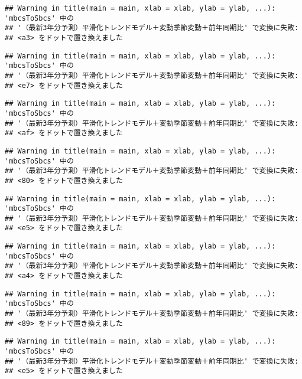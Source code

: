 \documentclass[]{article}
\begin{document}
\begin{verbatim}
## Warning in title(main = main, xlab = xlab, ylab = ylab, ...): 'mbcsToSbcs' 中の
## '（最新3年分予測）平滑化トレンドモデル＋変動季節変動＋前年同期比' で変換に失敗:
## <a3> をドットで置き換えました
\end{verbatim}

\begin{verbatim}
## Warning in title(main = main, xlab = xlab, ylab = ylab, ...): 'mbcsToSbcs' 中の
## '（最新3年分予測）平滑化トレンドモデル＋変動季節変動＋前年同期比' で変換に失敗:
## <e7> をドットで置き換えました
\end{verbatim}

\begin{verbatim}
## Warning in title(main = main, xlab = xlab, ylab = ylab, ...): 'mbcsToSbcs' 中の
## '（最新3年分予測）平滑化トレンドモデル＋変動季節変動＋前年同期比' で変換に失敗:
## <af> をドットで置き換えました
\end{verbatim}

\begin{verbatim}
## Warning in title(main = main, xlab = xlab, ylab = ylab, ...): 'mbcsToSbcs' 中の
## '（最新3年分予測）平滑化トレンドモデル＋変動季節変動＋前年同期比' で変換に失敗:
## <80> をドットで置き換えました
\end{verbatim}

\begin{verbatim}
## Warning in title(main = main, xlab = xlab, ylab = ylab, ...): 'mbcsToSbcs' 中の
## '（最新3年分予測）平滑化トレンドモデル＋変動季節変動＋前年同期比' で変換に失敗:
## <e5> をドットで置き換えました
\end{verbatim}

\begin{verbatim}
## Warning in title(main = main, xlab = xlab, ylab = ylab, ...): 'mbcsToSbcs' 中の
## '（最新3年分予測）平滑化トレンドモデル＋変動季節変動＋前年同期比' で変換に失敗:
## <a4> をドットで置き換えました
\end{verbatim}

\begin{verbatim}
## Warning in title(main = main, xlab = xlab, ylab = ylab, ...): 'mbcsToSbcs' 中の
## '（最新3年分予測）平滑化トレンドモデル＋変動季節変動＋前年同期比' で変換に失敗:
## <89> をドットで置き換えました
\end{verbatim}

\begin{verbatim}
## Warning in title(main = main, xlab = xlab, ylab = ylab, ...): 'mbcsToSbcs' 中の
## '（最新3年分予測）平滑化トレンドモデル＋変動季節変動＋前年同期比' で変換に失敗:
## <e5> をドットで置き換えました
\end{verbatim}
\end{document}
